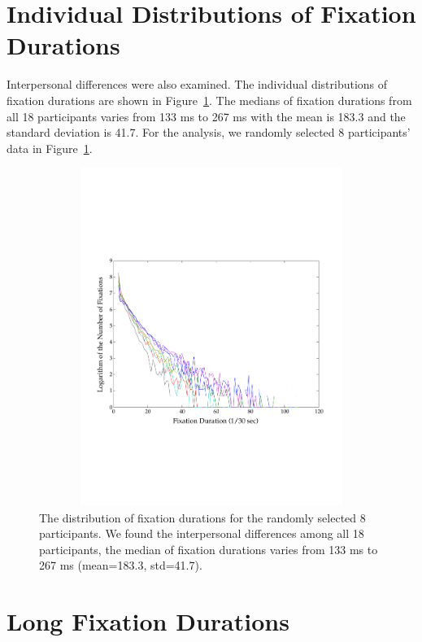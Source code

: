 \documentclass[oneside,master]{snueethesis}
\begin{document}
\section{Individual Distributions of Fixation Durations}

Interpersonal differences were also examined. The individual distributions of fixation durations are shown in Figure~\ref{fig:individual-fixation-duration}. The medians of fixation durations from all 18 participants varies from 133 ms to 267 ms with the mean is 183.3 and the standard deviation is 41.7. For the analysis, we randomly selected 8 participants' data in Figure~\ref{fig:individual-fixation-duration}. 


\begin{figure}
  \centerline{\includegraphics[width=150mm,height=110mm,trim=0mm 60mm 0mm 60mm]{./eps/individual_fixation_duration.pdf}}
  \caption[The distribution of fixation durations for individuals]{The distribution of fixation durations for the randomly selected 8 participants. We found the interpersonal differences among all 18 participants, the median of fixation durations varies from 133 ms to 267 ms (mean=183.3, std=41.7).}
  \label{fig:individual-fixation-duration}
\end{figure}


\section{Long Fixation Durations}
\label{subsec:Long-Fixation-Durations}
\end{document}
